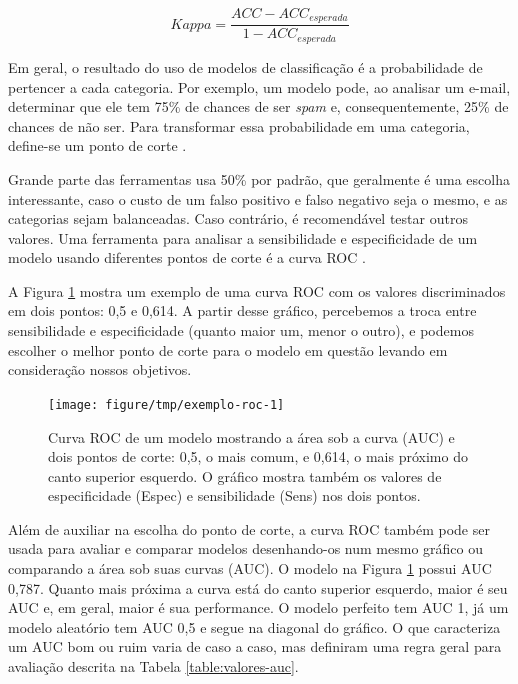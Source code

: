 \documentclass[a4paper,titlepage]{ppgi}\usepackage[]{graphicx}\usepackage[]{color}
\newenvironment{knitrout}{}{} %
\begin{document}
\begin{equation}
\label{eq:kappa}
Kappa = \frac{ACC - ACC_{esperada}}{1 - ACC_{esperada}}
\end{equation}

Em geral, o resultado do uso de modelos de classificação é a probabilidade de
pertencer a cada categoria. Por exemplo, um modelo pode, ao analisar um e-mail,
determinar que ele tem 75\% de chances de ser \emph{spam} e, consequentemente,
25\% de chances de não ser. Para transformar essa probabilidade em uma
categoria, define-se um ponto de corte \cite{Kuhn2013}.

Grande parte das ferramentas usa 50\% por padrão, que geralmente é uma escolha
interessante, caso o custo de um falso positivo e falso negativo seja o mesmo, e
as categorias sejam balanceadas. Caso contrário, é recomendável testar outros
valores. Uma ferramenta para analisar a sensibilidade e especificidade de um
modelo usando diferentes pontos de corte é a curva \gls{ROC}
\cite{Altman1994,Brown2006,Fawcett2006}.

A Figura \ref{fig:exemplo-roc} mostra um exemplo de uma curva \gls{ROC} com os
valores discriminados em dois pontos: 0,5 e 0,614. A partir desse gráfico,
percebemos a troca entre sensibilidade e especificidade (quanto maior um, menor
o outro), e podemos escolher o melhor ponto de corte para o modelo em questão
levando em consideração nossos objetivos.

\begin{knitrout}
\color{fgcolor}\begin{figure}
\texttt{[image: figure/tmp/exemplo-roc-1]} \caption[Curva ROC de um modelo mostrando a área sob a curva (AUC) e dois pontos de corte]{Curva ROC de um modelo mostrando a área sob a curva (AUC) e dois pontos de corte: 0,5, o mais comum, e 0,614, o mais próximo do canto superior esquerdo. O gráfico mostra também os valores de especificidade (Espec) e sensibilidade (Sens) nos dois pontos.}\label{fig:exemplo-roc}
\end{figure}


\end{knitrout}

Além de auxiliar na escolha do ponto de corte, a curva \gls{ROC} também pode
ser usada para avaliar e comparar modelos desenhando-os num mesmo gráfico ou
comparando a área sob suas curvas (\acrshort{AUC}). O modelo na Figura
\ref{fig:exemplo-roc} possui \acrshort{AUC} 0,787. Quanto mais próxima a curva está
do canto superior esquerdo, maior é seu \acrshort{AUC} e, em geral, maior é sua
performance.  O modelo perfeito tem \acrshort{AUC} 1, já um modelo aleatório
tem \acrshort{AUC} 0,5 e segue na diagonal do gráfico. O que caracteriza um
\acrshort{AUC} bom ou ruim varia de caso a caso, mas 
definiram uma regra geral para avaliação descrita na Tabela
\ref{table:valores-auc}.
\end{document}
